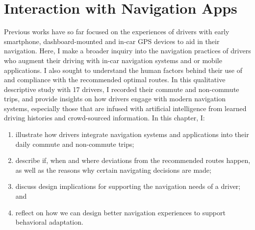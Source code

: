 
\chapter{Interaction with Navigation Apps}
Previous works have so far focused on the experiences of drivers with early smartphone, dashboard-mounted and in-car GPS devices to aid in their navigation\cite{Brown2012TheGPS, Dingus1997a, Mahmud2009UserDrivers}. Here, I make a broader inquiry into the navigation practices of drivers who augment their driving with in-car navigation systems and or mobile applications. I also sought to understand the human factors behind their use of and compliance with the recommended optimal routes. In this qualitative descriptive study with 17 drivers, I recorded their commute and non-commute trips, and provide insights on how drivers engage with modern navigation systems, especially those that are infused with artificial intelligence from learned driving histories and crowd-sourced information. In this chapter, I:

\begin{enumerate}
\item illustrate how drivers integrate navigation systems and applications into their daily commute and non-commute trips;
\item describe if, when and where deviations from the recommended routes happen, as well as the reasons why certain navigating decisions are made;
\item discuss design implications for supporting the navigation needs of a driver; and 
\item reflect on how we can design better navigation experiences to support behavioral adaptation.
\end{enumerate}

